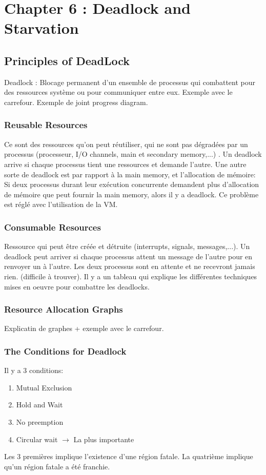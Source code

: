 \section{Chapter 6 : Deadlock and Starvation}

\subsection{Principles of DeadLock}
Deadlock : Blocage permanent d'un ensemble de processus qui combattent pour des ressources système ou pour communiquer entre eux.
Exemple avec le carrefour.
Exemple de joint progress diagram.

\subsubsection{Reusable Resources}
Ce sont des ressources qu'on peut réutiliser, qui ne sont pas dégradées par un processus (processeur, I/O channels, main et secondary memory,...) .
Un deadlock arrive si chaque processus tient une ressources et demande l'autre.
Une autre sorte de deadlock est par rapport à la main memory, et l'allocation de mémoire: Si deux processus durant leur exécution concurrente demandent plus d'allocation de mémoire que peut fournir la main memory, alors il y a deadlock.
Ce problème est réglé avec l'utilisation de la VM.

\subsubsection{Consumable Resources}
Ressource qui peut être créée et détruite (interrupts, signals, messages,...).
Un deadlock peut arriver si chaque processus attent un message de l'autre pour en renvoyer un à l'autre.
Les deux processus sont en attente et ne recevront jamais rien.
(difficile à trouver).
Il y a un tableau \cite[p.~265]{stallings} qui explique les différentes techniques mises en oeuvre pour combattre les deadlocks.

\subsubsection{Resource Allocation Graphs}
Explicatin de graphes + exemple avec le carrefour.

\subsubsection{The Conditions for Deadlock}
Il y a 3 conditions:
\begin{enumerate}
  \item Mutual Exclusion
  \item Hold and Wait
  \item No preemption
  \item Circular wait $\to$ La plus importante
\end{enumerate}
Les 3 premières implique l'existence d'une région fatale.
La quatrième implique qu'un région fatale a été franchie.

